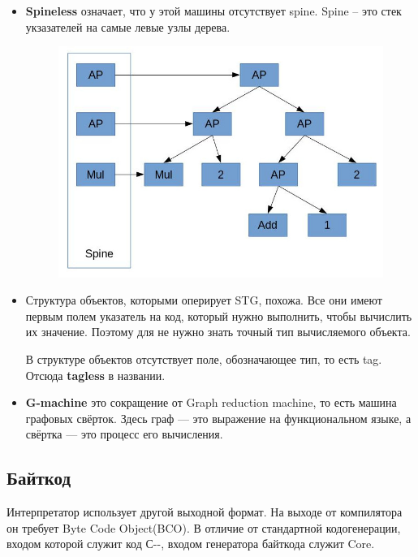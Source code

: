\documentclass[fontsize=14pt, paper=a4, pagesize, DIV=calc]{scrartcl}
\begin{document}
\begin{itemize}

\item \textbf{Spineless} означает, что у этой машины отсутствует spine. Spine
-- это стек укзазателей на самые левые узлы дерева.

\begin{figure}[H]
\centering
\includegraphics[scale=0.7]{spine.jpg}
\end{figure}

\item Структура объектов, которыми оперирует STG, похожа. Все они имеют первым
полем указатель на код, который нужно выполнить, чтобы вычислить их значение.
Поэтому для не нужно знать точный тип вычисляемого объекта. 

В структуре объектов отсутствует поле, обозначающее тип, то есть tag. Отсюда
\textbf{tagless} в
названии.

\item \textbf{G-machine} это сокращение от Graph reduction machine, то есть
машина графовых свёрток. Здесь граф --- это выражение на функциональном языке, а
свёртка --- это процесс его вычисления.

\end{itemize}

\subsection{Байткод}

Интерпретатор использует другой выходной формат. На выходе от компилятора он
требует Byte Code Object(BCO). В отличие от стандартной кодогенерации, входом
которой служит код С-{}-, входом генератора байткода служит Core.
\end{document}
